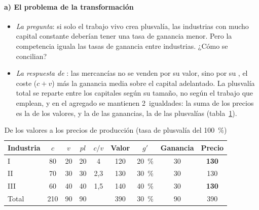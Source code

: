 \documentclass[11pt]{article}
\begin{document}
\paragraph{a) El problema de la transformación}
\begin{itemize}
\item \emph{La pregunta}: si solo el trabajo vivo crea plusvalía, las industrias con mucho capital constante deberían tener una tasa de ganancia menor. Pero la competencia iguala las tasas de ganancia entre industrias. ¿Cómo se concilian?
\item \emph{La respuesta de }\nocite{Marx1894Kapital}: las mercancías no se venden por su valor, sino por su , el coste ($c+v$) más la ganancia media sobre el capital adelantado. La plusvalía total se reparte entre los capitales según su tamaño, no según el trabajo que emplean, y en el agregado se mantienen 2~igualdades: la suma de los precios es la de los valores, y la de las ganancias, la de las plusvalías (tabla~\ref{tab:transformacion}).
\end{itemize}
\begin{table}[H]
\centering
\caption{De los valores a los precios de producción (tasa de plusvalía del 100~\%)}\label{tab:transformacion}
\small
\begin{tabular}{lcccccccc}
\toprule
\rowcolor{tceeazulpalido}\textbf{Industria} & $c$ & $v$ & $\mathit{pl}$ & $c/v$ & \textbf{Valor} & $g'$ & \textbf{Ganancia} & \textbf{Precio}\\
\midrule
I & 80 & 20 & 20 & 4 & 120 & 20~\% & 30 & \textcolor{tceeazul}{\textbf{130}}\\
II & 70 & 30 & 30 & 2,3 & 130 & 30~\% & 30 & 130\\
III & 60 & 40 & 40 & 1,5 & 140 & 40~\% & 30 & \textcolor{tceerojo}{\textbf{130}}\\
\midrule
Total & 210 & 90 & 90 & & 390 & 30~\% & 90 & 390\\
\bottomrule
\end{tabular}
\end{table}
\end{document}
